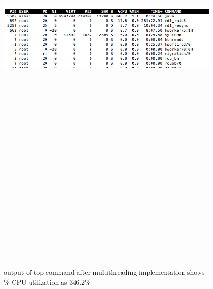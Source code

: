 \begin{figure}[htb]
\centering
\includegraphics[width=16cm,height=25cm,keepaspectratio]{image/cpu-per-2.png}
\caption[CPU utilization after multithreading implementation]{output of top command after multithreading implementation
shows \% CPU utilization as 346.2\%} 
\label{fig:cpu-per-2}
\end{figure}

